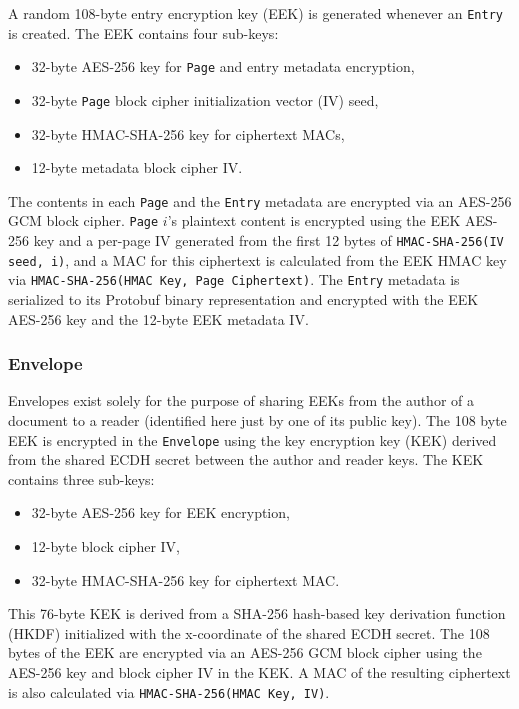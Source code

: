 \documentclass[10pt]{article}
\newcommand{\ttt}[1]{\texttt{#1}}
\def\Entry{\ttt{Entry}}
\def\Page{\ttt{Page}}
\def\Envelope{\ttt{Envelope}}
\begin{document}
A random 108-byte entry encryption key (EEK) is generated whenever an \Entry{} is created. The EEK contains four sub-keys:
\begin{itemize}
	\item 32-byte AES-256 key for \Page{} and entry metadata encryption,
	\item 32-byte \Page{} block cipher initialization vector (IV) seed,
	\item 32-byte HMAC-SHA-256 key for ciphertext MACs,
	\item 12-byte metadata block cipher IV.
\end{itemize}
The contents in each \Page{} and the \Entry{} metadata are encrypted via an AES-256 GCM block cipher. \Page{} $i$'s plaintext content is encrypted using the EEK AES-256 key and a per-page IV generated from the first 12 bytes of \ttt{HMAC-SHA-256(IV seed, i)}, and a MAC for this ciphertext is calculated from the EEK HMAC key via \ttt{HMAC-SHA-256(HMAC Key, Page Ciphertext)}. The \Entry{} metadata is serialized to its Protobuf binary representation and encrypted with the EEK AES-256 key and the 12-byte EEK metadata IV. 

\subsubsection{Envelope}
Envelopes exist solely for the purpose of sharing EEKs from the author of a document to a reader (identified here just by one of its public key). The 108 byte EEK is encrypted in the \Envelope{} using the key encryption key (KEK) derived from the shared ECDH secret between the author and reader keys. The KEK contains three sub-keys:
\begin{itemize}
	\item 32-byte AES-256 key for EEK encryption,
	\item 12-byte block cipher IV,
	\item 32-byte HMAC-SHA-256 key for ciphertext MAC.
\end{itemize}
This 76-byte KEK is derived from a SHA-256 hash-based key derivation function (HKDF) initialized with the x-coordinate of the shared ECDH secret. The 108 bytes of the EEK are encrypted via an AES-256 GCM block cipher using the AES-256 key and block cipher IV in the KEK. A MAC of the resulting ciphertext is also calculated via \ttt{HMAC-SHA-256(HMAC Key, IV)}.
\end{document}
